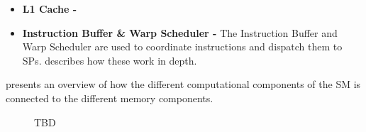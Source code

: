 \begin{itemize}
	
	\item \textbf{L1 Cache -} 
		
	\item  \textbf{Instruction Buffer \& Warp Scheduler -} The Instruction Buffer and Warp Scheduler are used to coordinate instructions and dispatch them to SPs.
	 describes how these work in depth.
		
\end{itemize}

 presents an overview of how the different computational components of the SM is connected to the different memory components.


\begin{figure}[H]
	\centering
	\caption{TBD}
	\label{fig:hw-sm-inside}
\end{figure}







